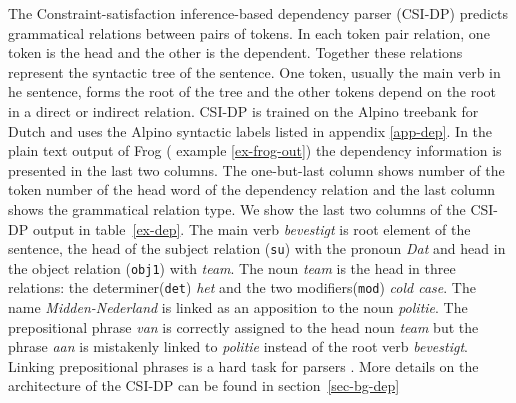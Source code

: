 \documentclass{book}
\begin{document}
The Constraint-satisfaction inference-based dependency parser (CSI-DP) \cite{Canisius+2006} predicts grammatical relations between pairs of tokens. In each token pair relation, one token is the head and the other is the dependent. Together these relations represent the syntactic tree of the sentence. One token, usually the main verb in he sentence, forms the root of the tree and the other tokens depend on the root in a direct or indirect relation. CSI-DP is trained on the Alpino treebank \cite{Bouma+01} for Dutch and uses the Alpino syntactic labels listed in appendix \ref{app-dep}.
In the plain text output of Frog ( example \ref{ex-frog-out}) the dependency information is presented in the last two columns. The one-but-last column shows number of the token number of the head word of the dependency relation and the last column shows the grammatical relation type.
We show the last two columns of the CSI-DP output in table~\ref{ex-dep}.
The main verb {\it bevestigt} is root element of the sentence, the head of the
subject relation ({\tt su}) with the pronoun {\it Dat} and head in the object
relation ({\tt obj1}) with {\it team}. The noun {\it team} is the head in three
relations: the determiner({\tt det}) {\it het} and the two modifiers({\tt mod})
{\it cold case}. The name {\it Midden-Nederland} is linked as an apposition to
the noun {\it politie}. The prepositional phrase {\it van} is correctly
assigned to the head noun {\it team} but the phrase {\it aan} is mistakenly
linked to {\it politie} instead of the root verb {\it bevestigt}. Linking
prepositional phrases is a hard task for parsers \cite{atterer2007}. More
details on the architecture of the CSI-DP can be found in section~\ref{sec-bg-dep}
\end{document}
